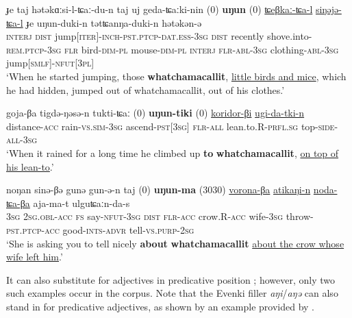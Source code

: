 \documentclass[output=paper]{langscibook}
\begin{document}
\ea \label{ex:pakendorf:25}
\gll ɟe
	taj
	hətəkɑːsi-l-ʨaː-du-n
	taj
	uj
	geda-ʨaːki-nin
	\textup{(0)}
	\textbf{uŋun}
	\textup{(0)}
	\uline{ʨeβkaː-ʨa-l}
	\uline{siŋəjə-ʨa-l}
	ɟe uŋun-duki-n
	tətʨanŋa-duki-n
	hətəkən-ə\\
     \textsc{interj}
     \textsc{dist}
     jump[\textsc{iter]-inch-pst.ptcp-dat.ess-3sg}
     \textsc{dist}
     recently
     shove.into-\textsc{rem.ptcp-3sg}
     {}
     \textsc{flr}
     {}
     bird-\textsc{dim-pl}
     mouse-\textsc{dim-pl}
     \textsc{interj}
     \textsc{flr-abl-3sg}
     clothing-\textsc{abl-3sg}
     jump[\textsc{smlf}]-\textsc{nfut[3pl]}\\
\glt ‘When he started jumping, those \textbf{whatchamacallit}, \uline{little birds and mice}, which he had hidden, jumped out of whatchamacallit, out of his clothes.’ 
\z


\ea \label{ex:pakendorf:26}
\gll goja-βa
	tigdə-ŋəsə-n
	tukti-ʨaː
	\textup{(0)}
	\textbf{uŋun-tiki}
	\textup{(0)}
	\uline{koridor-βi}
	\uline{ugi-da-tki-n}\\
     distance-\textsc{acc}
     rain-\textsc{vs.sim-3sg}
     ascend-\textsc{pst[3sg]}
     {}
     \textsc{flr-all}
     {}
     lean.to.R-\textsc{prfl.sg}
     top-\textsc{side-all-3sg}\\
\glt ‘When it rained for a long time he climbed up \textbf{to} \textbf{whatchamacallit}, \uline{on top of his lean-to}.’ 
\z

\ea \label{ex:pakendorf:27}
\gll noŋan
	sinə-βə
	gunə
	gun-ə-n
	taj
	\textup{(0)}
	\textbf{uŋun-ma}
	\textup{(3030)}
	\uline{vorona-βa}
	\uline{atikaŋi-n}
	\uline{noda-ʨa-βa}
	aja-ma-t
	ulguʨaːn-da-s\\
     \textsc{3sg}
     \textsc{2sg.obl-acc}
     \textsc{fs}
     say-\textsc{nfut-3sg}
     \textsc{dist}
     {}
     \textsc{flr-acc}
     {}
     crow.R-\textsc{acc}
     wife\textsc{-3sg}
     throw-\textsc{pst.ptcp-acc}
     good-\textsc{ints-advr}
     tell-\textsc{vs.purp-2sg}\\
\glt ‘She is asking you to tell nicely \textbf{about} \textbf{whatchamacallit} \uline{about the crow whose wife left him}.’ 
\z

It can also substitute for adjectives in predicative position ; however, only two such examples occur in the corpus. Note that the Evenki filler \textit{aŋi}/\textit{aŋə} can also stand in for predicative adjectives, as shown by an example provided by \citet[207, her ex. (12)]{Klyachko2022}.
\end{document}
